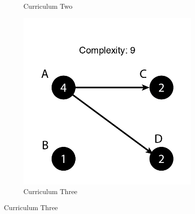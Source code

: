 \documentclass[botnum, fleqn]{unmeethesis}
\begin{document}
\begin{figure}
\begin{subfigure}[h!]{.3\linewidth}
        \caption{Curriculum Two}\label{fig:simple7}
      \end{subfigure}
      \begin{subfigure}[h!]{.3\linewidth}
        \includegraphics[width=\linewidth]{./figures/Simple9-1.png}
        \caption{Curriculum Three}\label{fig:simple91}
      \end{subfigure}


\end{figure}
\end{document}
